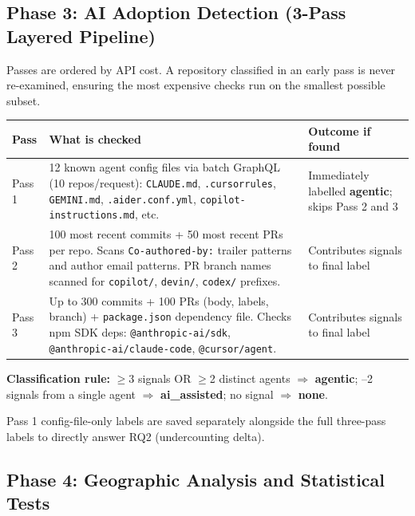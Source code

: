\documentclass[11pt,a4paper]{article}
\begin{document}
\subsection{Phase 3: AI Adoption Detection (3-Pass Layered Pipeline)}

Passes are ordered by API cost. A repository classified in an early pass is never
re-examined, ensuring the most expensive checks run on the smallest possible subset.

\begin{center}
\begin{tabularx}{\textwidth}{@{}p{1.6cm}Xp{3.4cm}@{}}
\toprule
\textbf{Pass} & \textbf{What is checked} & \textbf{Outcome if found} \\
\midrule
Pass 1 & 12 known agent config files via batch GraphQL (10 repos/request):
         \texttt{CLAUDE.md}, \texttt{.cursorrules}, \texttt{GEMINI.md},
         \texttt{.aider.conf.yml}, \texttt{copilot-instructions.md}, etc. &
         Immediately labelled \textbf{agentic}; skips Pass 2 and 3 \\
\addlinespace
Pass 2 & 100 most recent commits + 50 most recent PRs per repo.
         Scans \texttt{Co-authored-by:} trailer patterns and author email patterns.
         PR branch names scanned for \texttt{copilot/}, \texttt{devin/}, \texttt{codex/} prefixes. &
         Contributes signals to final label \\
\addlinespace
Pass 3 & Up to 300 commits + 100 PRs (body, labels, branch) + \texttt{package.json}
         dependency file. Checks npm SDK deps: \texttt{@anthropic-ai/sdk},
         \texttt{@anthropic-ai/claude-code}, \texttt{@cursor/agent}. &
         Contributes signals to final label \\
\bottomrule
\end{tabularx}
\end{center}

\medskip
\noindent\textbf{Classification rule:}
$\geq$3 signals OR $\geq$2 distinct agents $\Rightarrow$ \textbf{agentic};
--2 signals from a single agent $\Rightarrow$ \textbf{ai\_assisted};
\quad no signal $\Rightarrow$ \textbf{none}.

Pass 1 config-file-only labels are saved separately alongside the full three-pass labels
to directly answer RQ2 (undercounting delta).

\subsection{Phase 4: Geographic Analysis and Statistical Tests}
\end{document}
